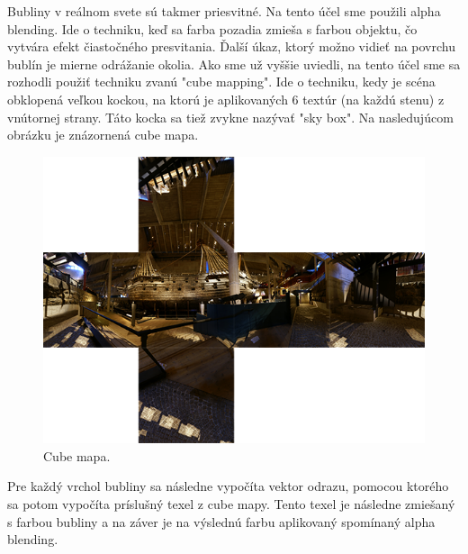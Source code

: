 Bubliny v reálnom svete sú takmer priesvitné. Na tento účel sme použili alpha blending. Ide o techniku, keď sa farba pozadia zmieša s farbou objektu, čo vytvára efekt čiastočného presvitania. Ďalší úkaz, ktorý možno vidieť na povrchu bublín je mierne odrážanie okolia. Ako sme už vyššie uviedli, na tento účel sme sa rozhodli použiť techniku zvanú "cube mapping". Ide o techniku, kedy je scéna obklopená veľkou kockou, na ktorú je aplikovaných 6 textúr (na každú stenu) z vnútornej strany. Táto kocka sa tiež zvykne nazývať "sky box". Na nasledujúcom obrázku je znázornená cube mapa. 

\begin{figure}[H]
	\begin{center}
		\includegraphics[height=\imageHeight]{images/cubemap.png}
		\caption{Cube mapa.}
		\label{img:cubemap}
	\end{center}
\end{figure}
\newpage
\noindent
Pre každý vrchol bubliny sa následne vypočíta vektor odrazu, pomocou ktorého sa potom vypočíta príslušný texel z cube mapy. Tento texel je následne zmiešaný s farbou bubliny a na záver je na výslednú farbu aplikovaný spomínaný alpha blending.



